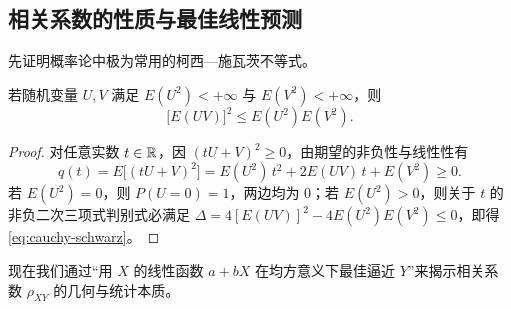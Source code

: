 \subsection{相关系数的性质与最佳线性预测}

先证明概率论中极为常用的柯西—施瓦茨不等式。

\begin{proposition}[柯西—施瓦茨不等式]
\label{prop:cauchy-schwarz}
若随机变量 $U,V$ 满足 $E(U^2)<+\infty$ 与 $E(V^2)<+\infty$，则
\begin{equation}
  \bigl[E(UV)\bigr]^2\le E(U^2)E(V^2).
  \label{eq:cauchy-schwarz}
\end{equation}
\end{proposition}
\begin{proof}
对任意实数 $t\in\mathbb{R}$，因 $(tU+V)^2\ge 0$，由期望的非负性与线性性有
\[
  q(t)=E\bigl[(tU+V)^2\bigr]=E(U^2)\,t^2+2E(UV)\,t+E(V^2)\ge 0.
\]
若 $E(U^2)=0$，则 $P(U=0)=1$，两边均为 $0$；若 $E(U^2)>0$，则关于 $t$ 的非负二次三项式判别式必满足 $\Delta=4[E(UV)]^2-4E(U^2)E(V^2)\le 0$，即得\eqref{eq:cauchy-schwarz}。
\end{proof}

现在我们通过“用 $X$ 的线性函数 $a+bX$ 在均方意义下最佳逼近 $Y$”来揭示相关系数 $\rho_{XY}$ 的几何与统计本质。

